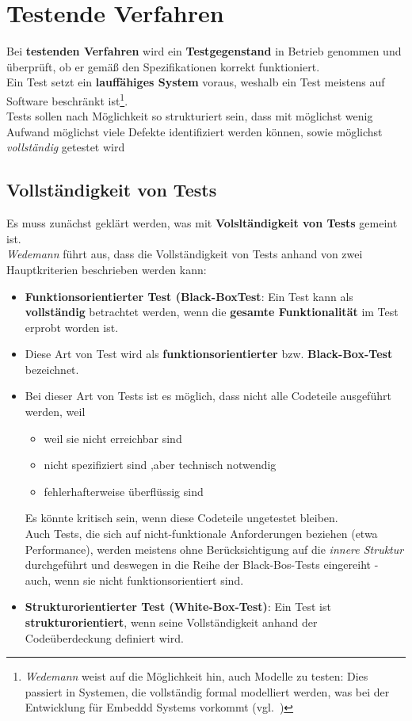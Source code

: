 \usepackage{lstmisc}\section{Testende Verfahren}
Bei \textbf{testenden Verfahren} wird ein \textbf{Testgegenstand} in Betrieb genommen und überprüft, ob er gemäß den Spezifikationen korrekt funktioniert.\\

\noindent
Ein Test setzt ein \textbf{lauffähiges System} voraus, weshalb ein Test meistens auf Software beschränkt ist\footnote{
\textit{Wedemann} weist auf die Möglichkeit hin, auch Modelle zu testen: Dies passiert in Systemen, die vollständig formal modelliert werden, was bei der Entwicklung für Embeddd Systems vorkommt (vgl.~\cite[41]{Wed09c})
}.\\

\noindent
Tests sollen nach Möglichkeit so strukturiert sein, dass mit möglichst wenig Aufwand möglichst viele Defekte identifiziert werden können, sowie möglichst \textit{vollständig} getestet wird

\subsection*{Vollständigkeit von Tests}
Es muss zunächst geklärt werden, was mit \textbf{Volsltändigkeit von Tests} gemeint ist.\\
\textit{Wedemann} führt aus, dass die Vollständigkeit von Tests anhand von zwei Hauptkriterien beschrieben werden kann:

\begin{itemize}
    \item \textbf{Funktionsorientierter Test (Black-BoxTest}: Ein Test kann als \textbf{vollständig} betrachtet werden, wenn die \textbf{gesamte Funktionalität} im Test erprobt worden ist.
    \item[] Diese Art von Test wird als \textbf{funktionsorientierter} bzw. \textbf{Black-Box-Test} bezeichnet.
    \item[] Bei dieser Art von Tests ist es möglich, dass nicht alle Codeteile ausgeführt werden, weil
    \begin{itemize}
        \item weil sie nicht erreichbar sind
        \item nicht spezifiziert sind ,aber technisch notwendig
        \item fehlerhafterweise überflüssig sind
    \end{itemize}
    \noindent
    Es könnte kritisch sein, wenn diese Codeteile ungetestet bleiben.\\
    Auch Tests, die sich auf nicht-funktionale Anforderungen beziehen (etwa Performance), werden meistens ohne Berücksichtigung auf die \textit{innere Struktur} durchgeführt und deswegen in die Reihe der Black-Bos-Tests eingereiht - auch, wenn sie nicht funktionsorientiert sind.
    \item \textbf{Strukturorientierter Test (White-Box-Test)}: Ein Test ist \textbf{strukturorientiert}, wenn seine Vollständigkeit anhand der Codeüberdeckung definiert wird.
\end{itemize}

